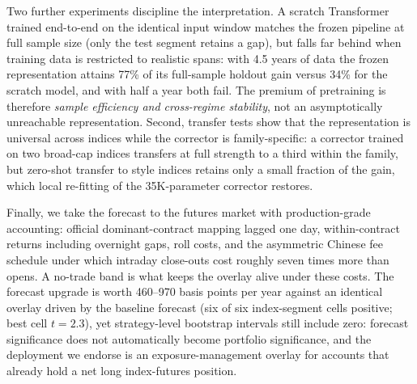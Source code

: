 \documentclass[12pt]{article}
\begin{document}
Two further experiments discipline the interpretation. A scratch Transformer
trained end-to-end on the identical input window matches the frozen pipeline at
full sample size (only the test segment retains a gap), but falls far behind
when training data is restricted to realistic spans: with 4.5 years of data
the frozen representation attains 77\% of its full-sample holdout gain versus
34\% for the scratch model, and with half a year both fail. The premium of
pretraining is therefore \emph{sample efficiency and cross-regime stability},
not an asymptotically unreachable representation. Second, transfer tests show
that the representation is universal across indices while the corrector is
family-specific: a corrector trained on two broad-cap indices transfers at
full strength to a third within the family, but zero-shot transfer to style
indices retains only a small fraction of the gain, which local re-fitting of
the 35K-parameter corrector restores.

Finally, we take the forecast to the futures market with production-grade
accounting: official dominant-contract mapping lagged one day, within-contract
returns including overnight gaps, roll costs, and the asymmetric Chinese fee
schedule under which intraday close-outs cost roughly seven times more than
opens. A no-trade band is what keeps the overlay alive under these costs.
The forecast upgrade is worth 460--970 basis points per year against an
identical overlay driven by the baseline forecast (six of six index-segment
cells positive; best cell $t=2.3$), yet strategy-level bootstrap intervals
still include zero: forecast significance does not automatically become
portfolio significance, and the deployment we endorse is an exposure-management
overlay for accounts that already hold a net long index-futures position.
\end{document}
